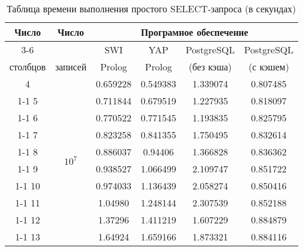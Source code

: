 \begin{table}[ht!]
	\centering
	\captionsetup{singlelinecheck = false, justification=raggedright}
	\caption{Таблица времени выполнения простого SELECT-запроса (в секундах)}
	\label{table:exper_1}
	\begin{tabular}{|c|c|c|c|c|c|}
		\hline
		\multirow{3}{*}{Число} & \multirow{3}{*}{Число} & \multicolumn{4}{c|}{Програмное обеспечение} \\ \cline{3-6}
		& & SWI & YAP & PostgreSQL & PostgreSQL \\ 
		столбцов & записей & Prolog & Prolog & (без кэша) & (с кэшем) \\ \hline
		4 & \multirow{10}{*}{$10^7$} & 0.659228 & 0.549383 & 1.339074 & 0.807485 	 \\ \cline{1-1} \cline{3-6}
		5 &  & 0.711844 &	0.679519 & 1.227935 & 0.818097  \\ \cline{1-1} \cline{3-6}
		6 &  & 0.770522 &	0.771545 & 1.193835 & 0.825795  \\ \cline{1-1} \cline{3-6}
		7 &  & 0.823258 &	0.841355 & 1.750495 & 0.832614 \\ \cline{1-1} \cline{3-6}
		8 &  & 0.886037 &	0.94406 & 1.366828 & 0.836362  \\ \cline{1-1} \cline{3-6}
		9 &  & 0.938527 & 1.066499 & 2.109747 & 0.851722 \\ \cline{1-1} \cline{3-6}
		10 &  & 0.974033 & 1.136439 & 2.058274 & 0.850416  \\ \cline{1-1} \cline{3-6}
		11 &  & 1.04980  & 1.248144 & 2.307539 & 0.852188  \\ \cline{1-1} \cline{3-6}
		12 &  & 1.37296  & 1.411219 & 1.607229 & 0.884879  \\ \cline{1-1} \cline{3-6}
		13 &  & 1.64924  &	1.659166 & 1.873321 & 0.884116 \\ \hline
	\end{tabular}
\end{table} 

